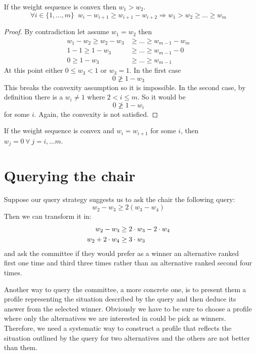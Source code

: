 \begin{claim}
	\label{clm:wsequence}
	If the weight sequence is convex then $w_{1} > w_{2}$.
	\[\forall i \in \{1,\ldots,m\} \;\; w_i - w_{i+1} \geq w_{i+1}-w_{i+2} \Rightarrow w_{1} > w_{2} \geq \ldots \geq w_{m}\] 
\end{claim}
\begin{proof}
	By contradiction let assume $w_{1} = w_{2}$ then 
	\begin{align*}
	w_{1} - w_{2} \geq w_{2} - w_{3} &\geq \dots \geq w_{m-1} - w_{m} \\
	1 - 1 \geq 1 - w_{3} &\geq \dots \geq w_{m-1} - 0 \\
	0 \geq 1 - w_{3} &\geq \dots \geq w_{m-1}
	\end{align*}
	At this point either $0\leq w_{3}<1$ or $w_{3}=1$. In the first case 
	\[0 \ngeq 1 - w_{3}\]
	This breaks the convexity assumption so it is impossible.
	In the second case, by definition there is a $w_{i} \neq 1$ where $2 < i \leq m$. So it would be 
	\[0 \ngeq 1 - w_{i}\]
	for some $i$. Again, the convexity is not satisfied.
\end{proof}

\begin{corollary}
	\label{cor:weq}
	If the weight sequence is convex and $w_{i} = w_{i+1}$ for some $i$, then $w_{j}=0 \ \forall \
	j=i, \dots m$.
\end{corollary}


\section{Querying the chair}
Suppose our query strategy suggests us to ask the chair the following query:
\[ w_{2} - w_{3} \geq 2(w_{3} - w_{4}) \]
Then we can transform it in:
\begin{align}
\label{eqn:juryquery}
w_{2} - w_{3} &\geq 2 \cdot w_{3} - 2 \cdot w_{4} \notag \\
w_{2} + 2 \cdot w_{4} &\geq 3 \cdot w_{3} 
\end{align}
and ask the committee if they would prefer as a winner an alternative ranked first one time and third three times rather than an alternative ranked second four times.

Another way to query the committee, a more concrete one, is to present them a profile representing the situation described by the query and then deduce its answer from the selected winner. Obviously we have to be sure to choose a profile where only the alternatives we are interested in could be pick as winners. Therefore, we need a systematic way to construct a profile that reflects the situation outlined by the query for two alternatives and the others are not better than them.


